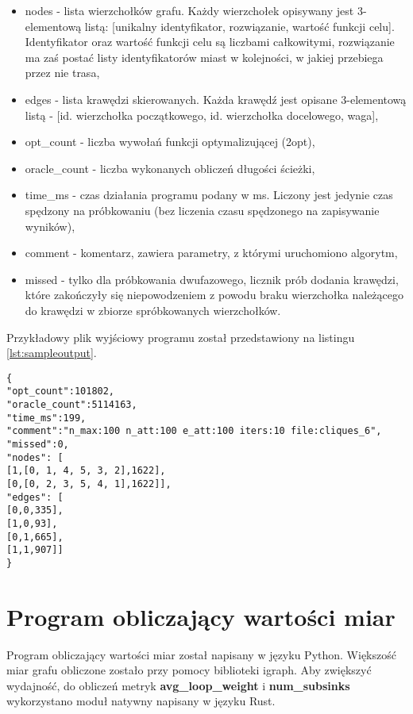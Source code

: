 \begin{itemize}
    \item nodes - lista wierzchołków grafu. Każdy wierzchołek opisywany jest 3-elementową listą:
          [unikalny identyfikator, rozwiązanie, wartość funkcji celu]. Identyfikator oraz wartość funkcji celu
          są liczbami całkowitymi, rozwiązanie ma zaś postać listy identyfikatorów miast w kolejności, w jakiej przebiega przez nie trasa,
    \item edges - lista krawędzi skierowanych. Każda krawędź jest opisane 3-elementową listą - [id. wierzchołka początkowego, id. wierzchołka docelowego, waga],
    \item opt\_count - liczba wywołań funkcji optymalizującej (2opt),
    \item oracle\_count - liczba wykonanych obliczeń długości ścieżki,
    \item time\_ms - czas działania programu podany w ms. Liczony jest jedynie czas spędzony na próbkowaniu
          (bez liczenia czasu spędzonego na zapisywanie wyników),
    \item comment - komentarz, zawiera parametry, z którymi uruchomiono algorytm,
    \item missed - tylko dla próbkowania dwufazowego, licznik prób dodania krawędzi, które zakończyły się
          niepowodzeniem z powodu braku wierzchołka należącego do krawędzi w zbiorze spróbkowanych wierzchołków.
\end{itemize}

Przykładowy plik wyjściowy programu został przedstawiony na listingu \ref{lst:sampleoutput}.

\begin{lstlisting}[caption={Przykład pliku wyjściowego po krótkim próbkowaniu małej instancji}, label=lst:sampleoutput]
{
"opt_count":101802,
"oracle_count":5114163,
"time_ms":199,
"comment":"n_max:100 n_att:100 e_att:100 iters:10 file:cliques_6",
"missed":0,
"nodes": [
[1,[0, 1, 4, 5, 3, 2],1622],
[0,[0, 2, 3, 5, 4, 1],1622]],
"edges": [
[0,0,335],
[1,0,93],
[0,1,665],
[1,1,907]]
}
\end{lstlisting}

\section{Program obliczający wartości miar}

Program obliczający wartości miar został napisany w języku Python.
Większość miar grafu obliczone zostało przy pomocy biblioteki igraph.
Aby zwiększyć wydajność, do obliczeń metryk \textbf{avg\_loop\_weight} i \textbf{num\_subsinks}
wykorzystano moduł natywny napisany w języku Rust.

